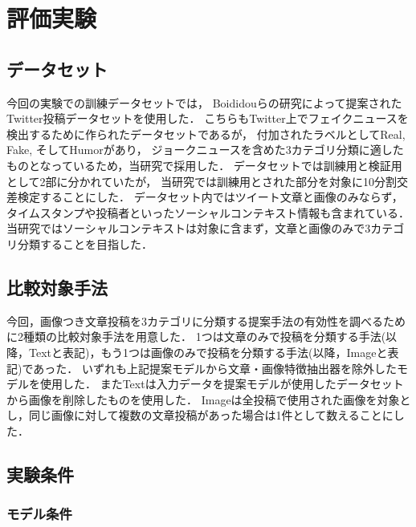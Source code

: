 %
\chapter{評価実験}\label{ch:experiment}
%
\section{データセット}
今回の実験での訓練データセットでは，
Boididouらの研究\cite{boididou2015verifying}によって提案されたTwitter投稿データセットを使用した．
こちらもTwitter上でフェイクニュースを検出するために作られたデータセットであるが，
付加されたラベルとしてReal, Fake, そしてHumorがあり，
ジョークニュースを含めた3カテゴリ分類に適したものとなっているため，当研究で採用した．
データセットでは訓練用と検証用として2部に分かれていたが，
当研究では訓練用とされた部分を対象に10分割交差検定することにした．
データセット内ではツイート文章と画像のみならず，
タイムスタンプや投稿者といったソーシャルコンテキスト情報も含まれている．
当研究ではソーシャルコンテキストは対象に含まず，文章と画像のみで3カテゴリ分類することを目指した．
% 
\section{比較対象手法}
今回，画像つき文章投稿を3カテゴリに分類する提案手法の有効性を調べるために2種類の比較対象手法を用意した．
1つは文章のみで投稿を分類する手法(以降，Textと表記)，もう1つは画像のみで投稿を分類する手法(以降，Imageと表記)であった．
いずれも上記提案モデルから文章・画像特徴抽出器を除外したモデルを使用した．
またTextは入力データを提案モデルが使用したデータセットから画像を削除したものを使用した．
Imageは全投稿で使用された画像を対象とし，同じ画像に対して複数の文章投稿があった場合は1件として数えることにした．
% 
\section{実験条件}
%
\subsection{モデル条件}
